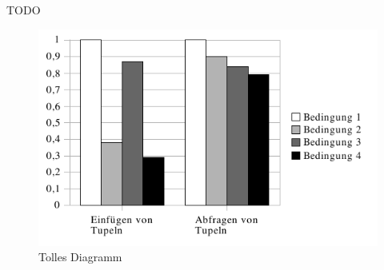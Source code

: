 TODO

\begin{figure}
	\centering
	\includegraphics{fig/benchmark.pdf}
	\caption{Tolles Diagramm}
\label{fig:diagramm}
\end{figure}
